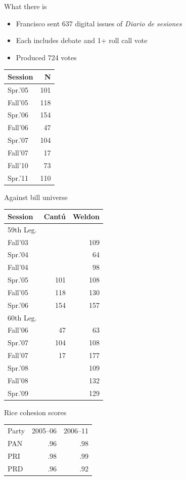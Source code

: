 \documentclass[bigger]{beamer}
\begin{document}
\begin{frame}[label={sec:org8cf5652}]{What there is}
\begin{itemize}
\item Francisco sent 637 digital issues of \emph{Diario de sesiones}
\item Each includes debate and 1+ roll call vote   \pause
\item Produced 724 votes
\end{itemize}
\begin{center}
\begin{tabular}{lr}
Session & N\\
\hline
Spr.'05 & 101\\
Fall'05 & 118\\
Spr.'06 & 154\\
Fall'06 & 47\\
Spr.'07 & 104\\
Fall'07 & 17\\
Fall'10 & 73\\
Spr.'11 & 110\\
\end{tabular}
\end{center}
\end{frame}
\begin{frame}[label={sec:org78a817c}]{Against bill universe}
\begin{center}
\begin{tabular}{lrr}
Session & Cantú & Weldon\\
\hline
\alert{59th Leg.} &  & \\
Fall'03 &  & 109\\
Spr.'04 &  & 64\\
Fall'04 &  & 98\\
Spr.'05 & 101 & 108\\
Fall'05 & 118 & 130\\
Spr.'06 & 154 & 157\\
\hline
\alert{60th Leg.} &  & \\
Fall'06 & 47 & 63\\
Spr.'07 & 104 & 108\\
Fall'07 & 17 & 177\\
Spr.'08 &  & 109\\
Fall'08 &  & 132\\
Spr.'09 &  & 129\\
\end{tabular}
\end{center}
\end{frame}
\begin{frame}[label={sec:orga47a76d}]{Rice cohesion scores}
\begin{center}
\begin{tabular}{lrr}
Party & 2005--06 & 2006--11\\
PAN & .96 & .98\\
PRI & .98 & .99\\
PRD & .96 & .92\\
\end{tabular}
\end{center}
\end{frame}
\end{document}

